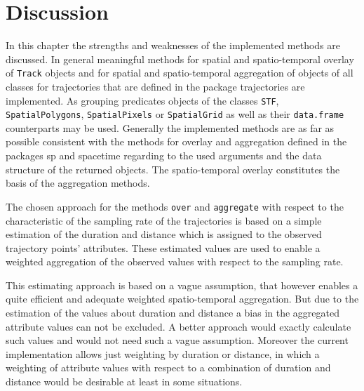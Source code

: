 \documentclass[12pt, oneside, a4paper]{scrbook}
\newcommand{\pkg}[1]{{\normalfont\fontseries{b}\selectfont #1}}
\let\code=\texttt
\begin{document}

\chapter{Discussion}
\label{chap:discussion}


In this chapter the strengths and weaknesses of the implemented methods are discussed.
In general meaningful methods for spatial and spatio-temporal overlay of \code{Track} objects and for spatial and spatio-temporal aggregation of objects of all classes for trajectories that are defined in the package \pkg{trajectories} are implemented. 
As grouping predicates objects of the classes \code{STF},
\code{SpatialPolygons}, \code{SpatialPixels} or \code{SpatialGrid} as well as their \code{data.frame} counterparts may be used.
Generally the implemented methods are as far as possible consistent with the methods for overlay and aggregation defined in the packages \pkg{sp} and \pkg{spacetime} regarding to the used arguments and the data structure of the returned objects. 
The spatio-temporal overlay constitutes the basis of the aggregation methods.
\par\medskip

The chosen approach for the methods \code{over} and \code{aggregate} with respect to the characteristic of the sampling rate of the trajectories is based on a simple estimation of the duration and distance which is assigned to the observed trajectory points' attributes.
These estimated values are used to enable a weighted aggregation of the observed values with respect to the sampling rate. 
\par\medskip

This estimating approach is based on a vague assumption, that however enables a quite efficient and adequate weighted spatio-temporal aggregation. 
But due to the estimation of the values about duration and distance a bias in the aggregated attribute values can not be excluded. 
A better approach would exactly calculate such values and would not need such a vague assumption.
Moreover the current implementation allows just weighting by duration or distance, in which a weighting of attribute values with respect to a combination of duration and distance would be desirable at least in some situations.
\par\medskip
\end{document}

